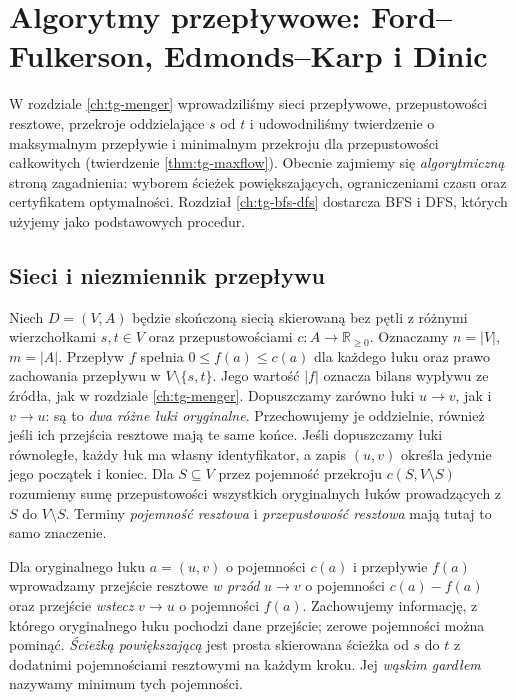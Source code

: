 \chapter{Algorytmy przepływowe: Ford--Fulkerson, Edmonds--Karp i Dinic}
\label{ch:tg-flow-algorithms}

W rozdziale \ref{ch:tg-menger} wprowadziliśmy sieci przepływowe,
przepustowości resztowe, przekroje oddzielające $s$ od $t$ i udowodniliśmy twierdzenie
o maksymalnym przepływie i minimalnym przekroju dla
przepustowości całkowitych (twierdzenie \ref{thm:tg-maxflow}).
Obecnie zajmiemy się \emph{algorytmiczną} stroną zagadnienia:
wyborem ścieżek powiększających, ograniczeniami czasu
oraz certyfikatem optymalności.
Rozdział \ref{ch:tg-bfs-dfs} dostarcza BFS i DFS, których
użyjemy jako podstawowych procedur.

\section{Sieci i niezmiennik przepływu}
\label{sec:tg-flow-model}

Niech $D=(V,A)$ będzie skończoną siecią skierowaną bez pętli
z różnymi wierzchołkami $s,t\in V$ oraz
przepustowościami $c:A\to\mathbb R_{\geq0}$.
Oznaczamy $n=|V|$, $m=|A|$.
Przepływ $f$ spełnia $0\leq f(a)\leq c(a)$ dla każdego łuku
oraz prawo zachowania przepływu w $V\setminus\{s,t\}$.
Jego wartość $|f|$ oznacza bilans wypływu ze źródła,
jak w rozdziale \ref{ch:tg-menger}.
Dopuszczamy zarówno łuki $u\to v$, jak i $v\to u$:
są to \emph{dwa różne łuki oryginalne}.
Przechowujemy je oddzielnie, również jeśli ich
przejścia resztowe mają te same końce. Jeśli dopuszczamy
łuki równoległe, każdy łuk ma własny identyfikator,
a zapis $(u,v)$ określa jedynie jego początek i koniec.
Dla $S\subseteq V$ przez pojemność przekroju
$c(S,V\setminus S)$ rozumiemy sumę przepustowości
wszystkich oryginalnych łuków prowadzących z $S$ do
$V\setminus S$. Terminy \emph{pojemność resztowa}
i \emph{przepustowość resztowa} mają tutaj to samo znaczenie.

\begin{definicja}
\label{def:tg-flow-residual}
Dla oryginalnego łuku $a=(u,v)$ o pojemności $c(a)$
i przepływie $f(a)$ wprowadzamy przejście resztowe
\emph{w przód} $u\to v$ o pojemności $c(a)-f(a)$
oraz przejście \emph{wstecz} $v\to u$ o pojemności $f(a)$.
Zachowujemy informację, z którego oryginalnego łuku
pochodzi dane przejście; zerowe pojemności można pominąć.
\emph{Ścieżką powiększającą} jest prosta skierowana
ścieżka od $s$ do $t$ z dodatnimi pojemnościami
resztowymi na każdym kroku.
Jej \emph{wąskim gardłem} nazywamy minimum tych pojemności.
\end{definicja}

